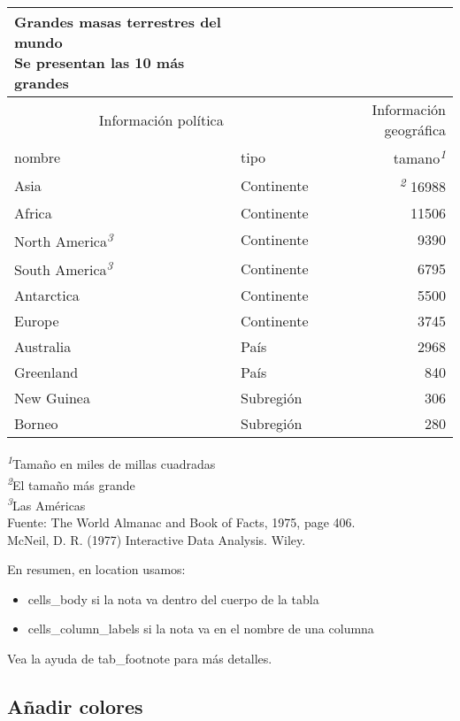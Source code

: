 \documentclass[
]{article}
\providecommand{\tightlist}{%
  \setlength{\itemsep}{0pt}\setlength{\parskip}{0pt}}
\begin{document}
\setlength{\LTpost}{0mm}
\begin{longtable}{llr}
\caption*{
{\large Grandes masas terrestres del mundo} \\ 
{\small Se presentan las 10 más grandes}
} \\ 
\toprule
\multicolumn{2}{c}{Información política} & Información geográfica \\ 
\cmidrule(lr){1-2} \cmidrule(lr){3-3}
nombre & tipo & tamano\textsuperscript{\textit{1}} \\ 
\midrule
Asia & Continente & \textsuperscript{\textit{2}} 16988 \\ 
Africa & Continente & 11506 \\ 
North America\textsuperscript{\textit{3}} & Continente & 9390 \\ 
South America\textsuperscript{\textit{3}} & Continente & 6795 \\ 
Antarctica & Continente & 5500 \\ 
Europe & Continente & 3745 \\ 
Australia & País & 2968 \\ 
Greenland & País & 840 \\ 
New Guinea & Subregión & 306 \\ 
Borneo & Subregión & 280 \\ 
\bottomrule
\end{longtable}
\begin{minipage}{\linewidth}
\textsuperscript{\textit{1}}Tamaño en miles de millas cuadradas\\
\textsuperscript{\textit{2}}El tamaño más grande\\
\textsuperscript{\textit{3}}Las Américas\\
Fuente: The World Almanac and Book of Facts, 1975, page 406.\\
McNeil, D. R. (1977) Interactive Data Analysis. Wiley.\\
\end{minipage}

En resumen, en location usamos:

\begin{itemize}
\tightlist
\item
  cells\_body si la nota va dentro del cuerpo de la tabla
\item
  cells\_column\_labels si la nota va en el nombre de una columna
\end{itemize}

Vea la ayuda de tab\_footnote para más detalles.

\hypertarget{auxf1adir-colores}{%
\subsection{Añadir colores}\label{auxf1adir-colores}}
\end{document}
